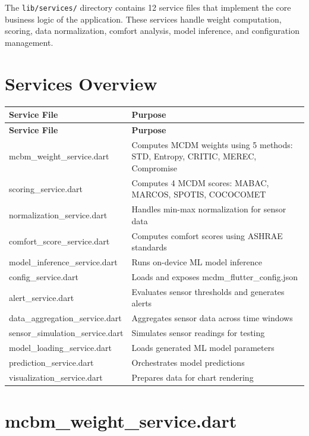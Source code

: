 \documentclass[12pt,a4paper,oneside]{report}
\begin{document}
The \texttt{lib/services/} directory contains 12 service files that implement the core business logic of the application. These services handle weight computation, scoring, data normalization, comfort analysis, model inference, and configuration management.

\section{Services Overview}

\begin{longtable}{p{4cm} p{11cm}}
\toprule
\textbf{Service File} & \textbf{Purpose} \\
\midrule
\endfirsthead
\toprule
\textbf{Service File} & \textbf{Purpose} \\
\midrule
\endhead
\bottomrule
\endfoot
mcbm\_weight\_service.dart & Computes MCDM weights using 5 methods: STD, Entropy, CRITIC, MEREC, Compromise \\
scoring\_service.dart & Computes 4 MCDM scores: MABAC, MARCOS, SPOTIS, COCOCOMET \\
normalization\_service.dart & Handles min-max normalization for sensor data \\
comfort\_score\_service.dart & Computes comfort scores using ASHRAE standards \\
model\_inference\_service.dart & Runs on-device ML model inference \\
config\_service.dart & Loads and exposes mcdm\_flutter\_config.json \\
alert\_service.dart & Evaluates sensor thresholds and generates alerts \\
data\_aggregation\_service.dart & Aggregates sensor data across time windows \\
sensor\_simulation\_service.dart & Simulates sensor readings for testing \\
model\_loading\_service.dart & Loads generated ML model parameters \\
prediction\_service.dart & Orchestrates model predictions \\
visualization\_service.dart & Prepares data for chart rendering \\
\bottomrule
\end{longtable}

\section{mcbm\_weight\_service.dart}
\end{document}
